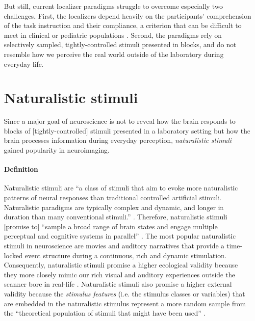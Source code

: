 But still, current localizer paradigms struggle to overcome especially two
challenges.
%
First, the localizers depend heavily on the participants' comprehension of the
task instruction and their compliance, a criterion that can be difficult to
meet in clinical or pediatric populations \citep{eickhoff2020towards,
vanderwal2015inscapes, vanderwal2019movies}.
Second, the paradigms rely on selectively sampled, tightly-controlled stimuli
presented in blocks, and do not resemble how we perceive the real world outside
of the laboratory during everyday life.


\section{Naturalistic stimuli}
%
Since a major goal of neuroscience is not to reveal how the brain
responds to blocks of [tightly-controlled] stimuli presented in a laboratory
setting but how the brain processes information during everyday perception,
\textit{naturalistic stimuli} gained popularity in neuroimaging.


\paragraph{Definition}

Naturalistic stimuli are ``a class of stimuli that aim to evoke more
naturalistic patterns of neural responses than traditional controlled artificial
stimuli. Naturalistic paradigms are typically complex and dynamic, and longer in
duration than many conventional stimuli.'' \citep{vanderwal2019movies}.
%
Therefore, naturalistic stimuli [promise to] ``sample a broad range of brain
states and engage multiple perceptual and cognitive systems in parallel''
\citep{haxby2020naturalistic}.
The most popular naturalistic stimuli in neuroscience are movies and auditory
narratives \citep[s.][for reviews]{jaaskelainen2021movies,
jaaskelainen2020neural} that provide a time-locked event structure during a
continuous, rich and dynamic stimulation.
%
Consequently, naturalistic stimuli promise a higher ecological validity
\citep{zaki2009need, hasson2012future, hamilton2018revolution} because they more
closely mimic our rich visual and auditory experiences outside the scanner bore
in real-life \citep{hasson2008neurocinematics, haxby2020naturalistic}.
%
Naturalistic stimuli also promise a higher external validity because the
\textit{stimulus features} (i.e. the stimulus classes or variables) that are
embedded in the naturalistic stimulus represent a more random sample from the
``theoretical population of stimuli that might have been used''
\citep{westfall2016fixing}.
%


